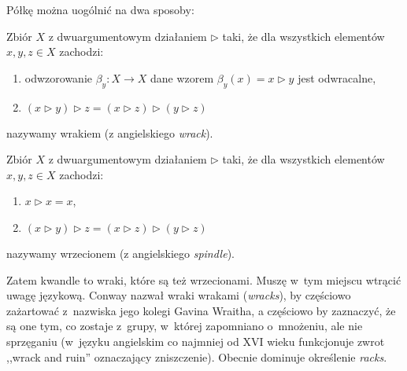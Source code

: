 Półkę można uogólnić na dwa sposoby:

\begin{definition}[wrak]
    Zbiór $X$ z dwuargumentowym działaniem $\triangleright$ taki, że dla wszystkich elementów $x, y, z \in X$ zachodzi:
    \begin{enumerate}
        \item odwzorowanie $\beta_y \colon X \to X$ dane wzorem $\beta_y(x) = x \triangleright y$ jest odwracalne,
        \item $(x \triangleright y) \triangleright z = (x \triangleright z) \triangleright (y \triangleright z)$
    \end{enumerate}
    nazywamy wrakiem (z angielskiego \emph{wrack}).
\end{definition}

\begin{definition}[wrzeciono]
    Zbiór $X$ z dwuargumentowym działaniem $\triangleright$ taki, że dla wszystkich elementów $x, y, z \in X$ zachodzi:
    \begin{enumerate}
        \item $x \triangleright x = x$,
        \item $(x \triangleright y) \triangleright z = (x \triangleright z) \triangleright (y \triangleright z)$
    \end{enumerate}
    nazywamy wrzecionem (z angielskiego \emph{spindle}).
\end{definition}

Zatem kwandle to wraki, które są też wrzecionami.
Muszę w~tym miejscu wtrącić uwagę językową.
Conway nazwał wraki wrakami (\emph{wracks}), by częściowo zażartować z~nazwiska jego kolegi Gavina Wraitha, a częściowo by zaznaczyć, że są one tym, co zostaje z~grupy, w~której zapomniano o~mnożeniu, ale nie sprzęganiu (w~języku angielskim co najmniej od XVI wieku funkcjonuje zwrot ,,wrack and ruin'' oznaczający zniszczenie).
Obecnie dominuje określenie \emph{racks}.



